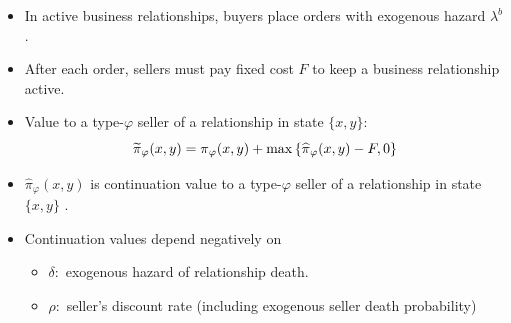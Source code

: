 \documentclass[notes=show]{beamer}
\begin{document}
\begin{frame}%



\begin{itemize}
\item In active business relationships, buyers place orders with exogenous
hazard $\lambda ^{b}$.%
\hyperref{}{}{appendix}{}%

\item After each order, sellers must pay fixed cost $F$ to keep a business
relationship active.

\item Value to a type-$\varphi $ seller of a relationship in state $\{x,y\}$:%
\[
\widetilde{\pi }_{\varphi }(x,y)=\pi _{\varphi }(x,y)+\max \left\{ \widehat{%
\pi }_{\varphi }(x,y)-F,0\right\} 
\]

\item $\widehat{\pi }_{\varphi }(x,y)$ is continuation value to a type-$%
\varphi $ seller of a relationship in state $\{x,y\}$ 
\hyperref{}{}{pihat_derivation}{}%
.

\item Continuation values depend negatively on

\begin{itemize}
\item $\delta :$ exogenous hazard of relationship death.

\item $\rho :$ seller's discount rate (including exogenous seller death probability)
\end{itemize}
\end{itemize}

\end{frame}%
\end{document}
